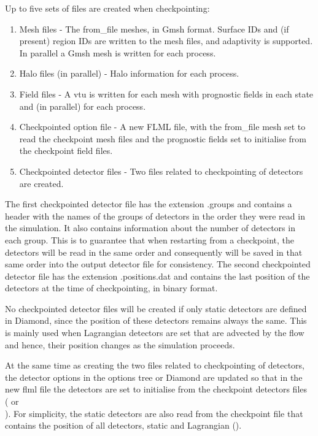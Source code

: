 Up to five sets of files are created when checkpointing:
\begin{enumerate}
\item Mesh files - The from\_file meshes, in Gmsh format. Surface IDs
  and (if present) region IDs are written to the mesh files, and adaptivity
  is supported. In parallel a Gmsh mesh is written for each process.
\item Halo files (in parallel) - Halo information for each process.
\item Field files - A vtu is written for each mesh with prognostic fields in
  each state and (in parallel) for each process.
\item Checkpointed option file - A new FLML file, with the from\_file mesh
  set to read the checkpoint mesh files and the prognostic fields set
  to initialise from the checkpoint field files.
\item Checkpointed detector files - Two files related to checkpointing of
  detectors are created.
\end{enumerate}

The first checkpointed detector file has the extension .groups and contains
a header with the names of the groups of detectors in the order they were
read in the simulation. It also contains information about the number of
detectors in each group. This is to guarantee that when restarting from a
checkpoint, the detectors will be read in the same order and consequently
will be saved in that same order into the output detector file for
consistency.  The second checkpointed detector file has the extension
.positions.dat and contains the last position of the detectors at the time 
of checkpointing, in binary format.

No checkpointed detector files will be created if only static detectors are
defined in Diamond, since the position of these detectors remains always the
same. This is mainly used when Lagrangian detectors are set that are
advected by the flow and hence, their position changes as the simulation
proceeds.

At the same time as creating the two files related to checkpointing of
detectors, the detector options in the options tree or Diamond are updated
so that in the new flml file the detectors are set to initialise from the
checkpoint detectors files \\
( or \\
). For
simplicity, the static detectors are also read from the checkpoint file that
contains the position of all detectors, static and Lagrangian
().

